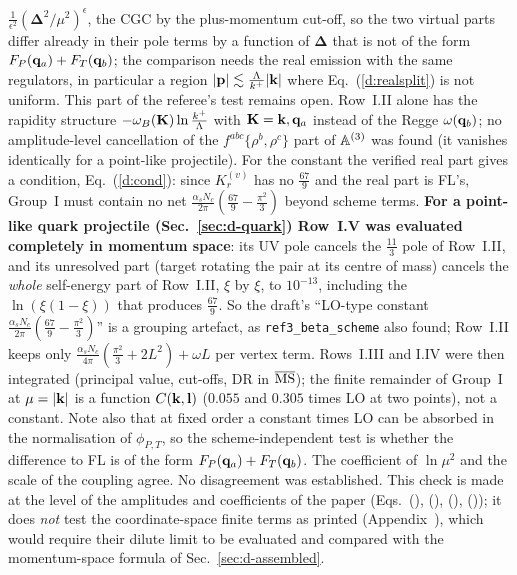 $\frac{1}{\epsilon^2}(\boldsymbol\Delta^2/\mu^2)^\epsilon$, the CGC by the plus-momentum cut-off, so the two virtual parts differ already in their pole terms by a function of $\boldsymbol\Delta$ that is not of the form $F_P(\mathbf{q}_a)+F_T(\mathbf{q}_b)$; the comparison needs the real emission with the same regulators, in particular a region $|\mathbf{p}|\lesssim\frac{\Lambda}{k^+}|\mathbf{k}|$ where Eq.~(\ref{d:realsplit}) is not uniform. This part of the referee's test remains open. Row~I.II alone has the rapidity structure $-\omega_B(\mathbf{K})\ln\frac{k^+}{\Lambda}$ with $\mathbf{K}=\mathbf{k},\mathbf{q}_a$ instead of the Regge $\omega(\mathbf{q}_b)$; no amplitude-level cancellation of the $f^{abc}\{\rho^b,\rho^c\}$ part of $\mathbb{A}^{(3)}$ was found (it vanishes identically for a point-like projectile). For the constant the verified real part gives a condition, Eq.~(\ref{d:cond}): since $K^{(v)}_r$ has no $\frac{67}{9}$ and the real part is FL's, Group~I must contain no net $\frac{\alpha_sN_c}{2\pi}(\frac{67}{9}-\frac{\pi^2}{3})$ beyond scheme terms. \textbf{For a point-like quark projectile (Sec.~\ref{sec:d-quark}) Row~I.V was evaluated completely in momentum space}: its UV pole cancels the $\frac{11}{3}$ pole of Row~I.II, and its unresolved part (target rotating the pair at its centre of mass) cancels the \emph{whole} self-energy part of Row~I.II, $\xi$ by $\xi$, to $10^{-13}$, including the $\ln(\xi(1-\xi))$ that produces $\frac{67}{9}$. So the draft's ``LO-type constant $\frac{\alpha_sN_c}{2\pi}(\frac{67}{9}-\frac{\pi^2}{3})$'' is a grouping artefact, as \texttt{ref3\_beta\_scheme} also found; Row~I.II keeps only $\frac{\alpha_sN_c}{4\pi}(\frac{\pi^2}{3}+2L^2)+\omega L$ per vertex term. Rows~I.III and I.IV were then integrated (principal value, cut-offs, DR in $\overline{\rm MS}$); the finite remainder of Group~I at $\mu=|\mathbf{k}|$ is a function $C(\mathbf{k},\mathbf{l})$ ($0.055$ and $0.305$ times LO at two points), not a constant. Note also that at fixed order a constant times LO can be absorbed in the normalisation of $\phi_{P,T}$, so the scheme-independent test is whether the difference to FL is of the form $F_P(\mathbf{q}_a)+F_T(\mathbf{q}_b)$. The coefficient of $\ln\mu^2$ and the scale of the coupling agree. No disagreement was established. This check is made at the level of the amplitudes and coefficients of the paper (Eqs.~(), (), (), ()); it does \emph{not} test the coordinate-space finite terms as printed (Appendix~), which would require their dilute limit to be evaluated and compared with the momentum-space formula of Sec.~\ref{sec:d-assembled}.

